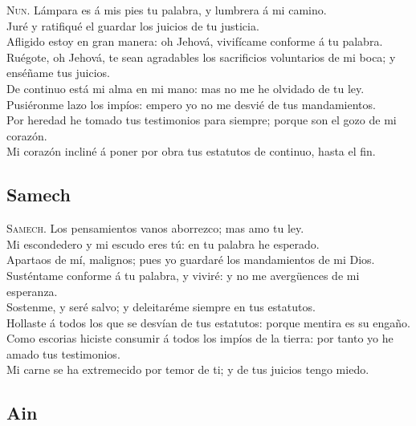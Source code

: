  \textsc{Nun}. Lámpara es á mis pies tu palabra, y
lumbrera á mi camino.\\
 Juré y ratifiqué el guardar los juicios de tu
justicia.\\
 Afligido estoy en gran manera: oh Jehová, vivifícame
conforme á tu palabra.\\
 Ruégote, oh Jehová, te sean agradables los sacrificios
voluntarios de mi boca; y enséñame tus juicios.\\
 De continuo está mi alma en mi mano: mas no me he
olvidado de tu ley.\\
 Pusiéronme lazo los impíos: empero yo no me desvié de
tus mandamientos.\\
 Por heredad he tomado tus testimonios para siempre;
porque son el gozo de mi corazón.\\
 Mi corazón incliné á poner por obra tus estatutos de
continuo, hasta el fin.

\hypertarget{samech}{%
\subsection{Samech}\label{samech}}

 \textsc{Samech}. Los pensamientos vanos aborrezco; mas
amo tu ley.\\
 Mi escondedero y mi escudo eres tú: en tu palabra he
esperado.\\
 Apartaos de mí, malignos; pues yo guardaré los
mandamientos de mi Dios.\\
 Susténtame conforme á tu palabra, y viviré: y no me
avergüences de mi esperanza.\\
 Sostenme, y seré salvo; y deleitaréme siempre en tus
estatutos.\\
 Hollaste á todos los que se desvían de tus estatutos:
porque mentira es su engaño.\\
 Como escorias hiciste consumir á todos los impíos de la
tierra: por tanto yo he amado tus testimonios.\\
 Mi carne se ha extremecido por temor de ti; y de tus
juicios tengo miedo.

\hypertarget{ain}{%
\subsection{Ain}\label{ain}}

